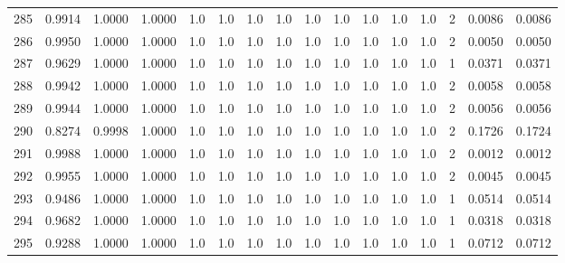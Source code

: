 \begin{tabular}{lrrrrrrrrrrrrrrr}
285 &      0.9914 &  1.0000 &  1.0000 &     1.0 &     1.0 &     1.0 &     1.0 &     1.0 &     1.0 &     1.0 &      1.0 &        1.0 &      2 &                    0.0086 &                     0.0086 \\
286 &      0.9950 &  1.0000 &  1.0000 &     1.0 &     1.0 &     1.0 &     1.0 &     1.0 &     1.0 &     1.0 &      1.0 &        1.0 &      2 &                    0.0050 &                     0.0050 \\
287 &      0.9629 &  1.0000 &  1.0000 &     1.0 &     1.0 &     1.0 &     1.0 &     1.0 &     1.0 &     1.0 &      1.0 &        1.0 &      1 &                    0.0371 &                     0.0371 \\
288 &      0.9942 &  1.0000 &  1.0000 &     1.0 &     1.0 &     1.0 &     1.0 &     1.0 &     1.0 &     1.0 &      1.0 &        1.0 &      2 &                    0.0058 &                     0.0058 \\
289 &      0.9944 &  1.0000 &  1.0000 &     1.0 &     1.0 &     1.0 &     1.0 &     1.0 &     1.0 &     1.0 &      1.0 &        1.0 &      2 &                    0.0056 &                     0.0056 \\
290 &      0.8274 &  0.9998 &  1.0000 &     1.0 &     1.0 &     1.0 &     1.0 &     1.0 &     1.0 &     1.0 &      1.0 &        1.0 &      2 &                    0.1726 &                     0.1724 \\
291 &      0.9988 &  1.0000 &  1.0000 &     1.0 &     1.0 &     1.0 &     1.0 &     1.0 &     1.0 &     1.0 &      1.0 &        1.0 &      2 &                    0.0012 &                     0.0012 \\
292 &      0.9955 &  1.0000 &  1.0000 &     1.0 &     1.0 &     1.0 &     1.0 &     1.0 &     1.0 &     1.0 &      1.0 &        1.0 &      2 &                    0.0045 &                     0.0045 \\
293 &      0.9486 &  1.0000 &  1.0000 &     1.0 &     1.0 &     1.0 &     1.0 &     1.0 &     1.0 &     1.0 &      1.0 &        1.0 &      1 &                    0.0514 &                     0.0514 \\
294 &      0.9682 &  1.0000 &  1.0000 &     1.0 &     1.0 &     1.0 &     1.0 &     1.0 &     1.0 &     1.0 &      1.0 &        1.0 &      1 &                    0.0318 &                     0.0318 \\
295 &      0.9288 &  1.0000 &  1.0000 &     1.0 &     1.0 &     1.0 &     1.0 &     1.0 &     1.0 &     1.0 &      1.0 &        1.0 &      1 &                    0.0712 &                     0.0712 \\

\end{tabular}
